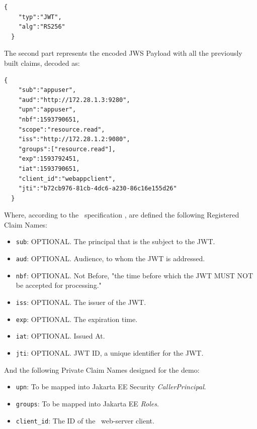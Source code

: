 \begin{lstlisting}[basicstyle=\ttfamily]
  {
    "typ":"JWT",
    "alg":"RS256"
  }
\end{lstlisting}

\noindent The second part represents the encoded JWS Payload with all the previously built claims, decoded as:

\begin{lstlisting}[basicstyle=\ttfamily]
  {
    "sub":"appuser",
    "aud":"http://172.28.1.3:9280",
    "upn":"appuser",
    "nbf":1593790651,
    "scope":"resource.read",
    "iss":"http://172.28.1.2:9080",
    "groups":["resource.read"],
    "exp":1593792451,
    "iat":1593790651,
    "client_id":"webappclient",
    "jti":"b72cb976-81cb-4dc6-a230-86c16e155d26"
  }
\end{lstlisting}

\noindent Where, according to the \ specification \cite{RFC7519}, are defined the following Registered Claim Names:

\begin{itemize}
    \item \texttt{sub}: OPTIONAL. The principal that is the subject to the JWT.
    \item \texttt{aud}: OPTIONAL. Audience, to whom the JWT is addressed.
    \item \texttt{nbf}: OPTIONAL. Not Before, "the time before which the JWT MUST NOT be accepted for processing." \cite{RFC7519}
    \item \texttt{iss}: OPTIONAL. The issuer of the JWT.
    \item \texttt{exp}: OPTIONAL. The expiration time.
    \item \texttt{iat}: OPTIONAL. Issued At.
    \item \texttt{jti}: OPTIONAL. JWT ID, a unique identifier for the JWT.
\end{itemize}

\noindent And the following Private Claim Names designed for the demo:

\begin{itemize}
    \item \texttt{upn}: To be mapped into Jakarta EE Security \textit{CallerPrincipal}.
    \item \texttt{groups}: To be mapped into Jakarta EE \textit{Roles}.
    \item \texttt{client\_id}: The ID of the \oauth\ web-server client.
\end{itemize}

